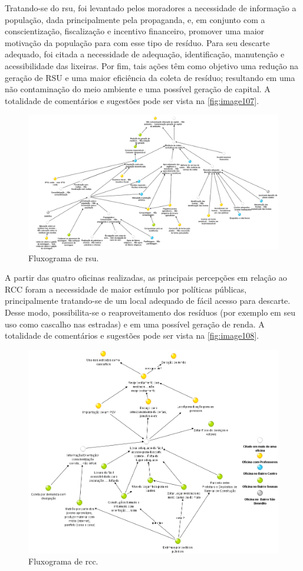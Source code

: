 Tratando-se do \gls{rsu}, foi levantado pelos moradores a necessidade de informação a população, dada principalmente pela propaganda, e, em conjunto com a conscientização, fiscalização e incentivo financeiro, promover uma maior motivação da população para com esse tipo de resíduo. Para seu descarte adequado, foi citada a necessidade de adequação, identificação, manutenção e acessibilidade das lixeiras. Por fim, tais ações têm como objetivo uma redução na geração de RSU e uma maior eficiência da coleta de resíduo; resultando em uma não contaminação do meio ambiente e uma possível geração de capital. A totalidade de comentários e sugestões pode ser vista na \autoref{fig:image107}.

\begin{figure}
	\centering
	\includegraphics[width=0.75\linewidth]{produtos/prodtres/image107}
	\caption{Fluxograma de \gls{rsu}.}
	\label{fig:image107}
\end{figure}

A partir das quatro oficinas realizadas, as principais percepções em relação ao RCC foram a necessidade de maior estímulo por políticas públicas, principalmente tratando-se de um local adequado de fácil acesso para descarte. Desse modo, possibilita-se o reaproveitamento dos resíduos (por exemplo em seu uso como cascalho nas estradas) e em uma possível geração de renda. A totalidade de comentários e sugestões pode ser vista na \autoref{fig:image108}.

\begin{figure}
	\centering
	\includegraphics[width=0.75\linewidth]{produtos/prodtres/image108}
	\caption{Fluxograma de \gls{rcc}.}
	\label{fig:image108}
\end{figure}

